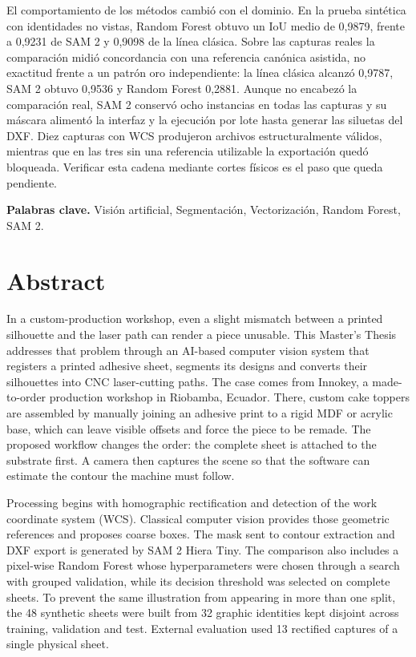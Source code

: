 \documentclass[11pt,a4paper,spanish]{book}
\numberwithin{equation}{chapter}
\begin{document}
El comportamiento de los métodos cambió con el dominio. En la prueba sintética con identidades no vistas, Random Forest obtuvo un IoU medio de 0,9879, frente a 0,9231 de SAM 2 y 0,9098 de la línea clásica. Sobre las capturas reales la comparación midió concordancia con una referencia canónica asistida, no exactitud frente a un patrón oro independiente: la línea clásica alcanzó 0,9787, SAM 2 obtuvo 0,9536 y Random Forest 0,2881. Aunque no encabezó la comparación real, SAM 2 conservó ocho instancias en todas las capturas y su máscara alimentó la interfaz y la ejecución por lote hasta generar las siluetas del DXF. Diez capturas con WCS produjeron archivos estructuralmente válidos, mientras que en las tres sin una referencia utilizable la exportación quedó bloqueada. Verificar esta cadena mediante cortes físicos es el paso que queda pendiente.

\textbf{Palabras clave.} Visión artificial, Segmentación, Vectorización, Random Forest, SAM 2.

\chapter*{Abstract}
In a custom-production workshop, even a slight mismatch between a printed silhouette and the laser path can render a piece unusable. This Master's Thesis addresses that problem through an AI-based computer vision system that registers a printed adhesive sheet, segments its designs and converts their silhouettes into CNC laser-cutting paths. The case comes from Innokey, a made-to-order production workshop in Riobamba, Ecuador. There, custom cake toppers are assembled by manually joining an adhesive print to a rigid MDF or acrylic base, which can leave visible offsets and force the piece to be remade. The proposed workflow changes the order: the complete sheet is attached to the substrate first. A camera then captures the scene so that the software can estimate the contour the machine must follow.

Processing begins with homographic rectification and detection of the work coordinate system (WCS). Classical computer vision provides those geometric references and proposes coarse boxes. The mask sent to contour extraction and DXF export is generated by SAM 2 Hiera Tiny. The comparison also includes a pixel-wise Random Forest whose hyperparameters were chosen through a search with grouped validation, while its decision threshold was selected on complete sheets. To prevent the same illustration from appearing in more than one split, the 48 synthetic sheets were built from 32 graphic identities kept disjoint across training, validation and test. External evaluation used 13 rectified captures of a single physical sheet.
\end{document}

